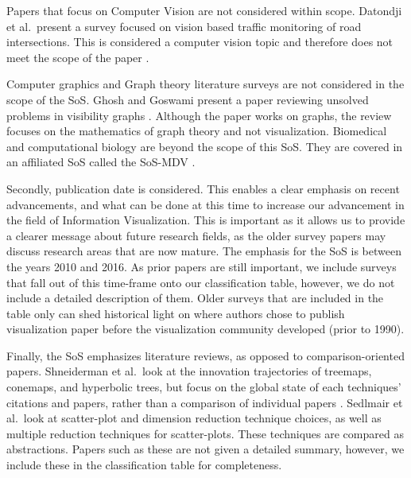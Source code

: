 Papers that focus on Computer Vision are not considered within scope. Datondji et al.\ present a survey focused on vision based traffic monitoring of road intersections. This is considered a computer vision topic and therefore does not meet the scope of the paper \cite{datondji2016survey}.

Computer graphics and Graph theory literature surveys are not considered in the scope of the SoS. Ghosh and Goswami present a paper reviewing unsolved problems in visibility graphs \cite{ghosh2013unsolved}. Although the paper works on graphs, the review focuses on the mathematics of graph theory and not visualization. Biomedical and computational biology are beyond the scope of this SoS. They are covered in an affiliated SoS called the SoS-MDV \cite{alharbi2017molecular}. 

Secondly, publication date is considered. This enables a clear emphasis on recent advancements, and what can be done at this time to increase our advancement in the field of Information Visualization. This is important as it allows us to provide a clearer message about future research fields, as the older survey papers may discuss research areas that are now mature. The emphasis for the SoS is between the years 2010 and 2016. As prior papers are still important, we include surveys that fall out of this time-frame onto our classification table, however, we do not include a detailed description of them. Older surveys that are included in the table only can shed historical light on where authors chose to publish visualization paper before the visualization community developed (prior to 1990).

Finally, the SoS emphasizes literature reviews, as opposed to comparison-oriented papers. Shneiderman et al.\ look at the innovation trajectories of treemaps, conemaps, and hyperbolic trees, but focus on the global state of each techniques' citations and papers, rather than a comparison of individual papers \cite{schneiderman2012innovation}. Sedlmair et al.\ look at scatter-plot and dimension reduction technique choices, as well as multiple reduction techniques for scatter-plots. These techniques are compared as abstractions\cite{sedlmair2013empirical}. Papers such as these are not given a detailed summary, however, we include these in the classification table for completeness.




